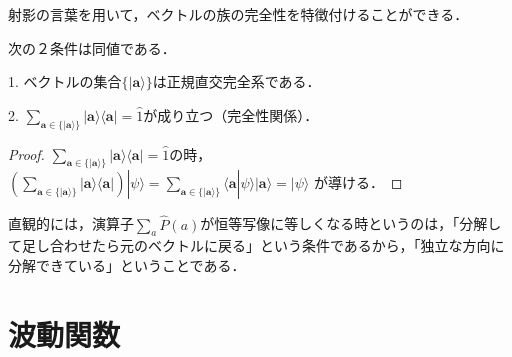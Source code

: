 \documentclass[uplatex, dvipdfmx]{jsreport}
\begin{document}
射影の言葉を用いて，ベクトルの族の完全性を特徴付けることができる．
\begin{proposition}
    次の２条件は同値である．

    1. ベクトルの集合$\{|\mathbf{a}\rangle\}$は正規直交完全系である．

    2. $\sum_{\mathbf{a}\in\{|\mathbf{a}\rangle\}}|\mathbf{a}\rangle\langle\mathbf{a}|=\hat{1}$が成り立つ（完全性関係）．
\end{proposition}
\begin{proof}
    $\sum_{\mathbf{a}\in\{|\mathbf{a}\rangle\}}|\mathbf{a}\rangle\langle\mathbf{a}|=\hat{1}$の時，
    $\left(\sum_{\mathbf{a}\in\{|\mathbf{a}\rangle\}}|\mathbf{a}\rangle\langle\mathbf{a}|\right)|\psi\rangle=\sum_{\mathbf{a}\in\{|\mathbf{a}\rangle\}}\langle\mathbf{a}|\psi\rangle|\mathbf{a}\rangle=|\psi\rangle$
    が導ける．
\end{proof}
\begin{remark}
    直観的には，演算子$\sum_a\hat{P}(a)$が恒等写像に等しくなる時というのは，「分解して足し合わせたら元のベクトルに戻る」という条件であるから，「独立な方向に分解できている」ということである．
\end{remark}

\section{波動関数}
\end{document}
